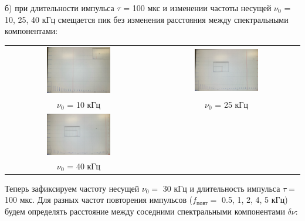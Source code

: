 \documentclass[a4paper,12pt]{article} %
\begin{document}
\hfill \break \hfill \break б) при длительности импульса $\tau$ = 100 мкс и изменении частоты несущей $\nu_{0}$ = 10, 25, 40 кГц смещается пик без изменения расстояния между спектральными компонентами:

\hfill \break \begin{center}
\begin{tabular}{cc}
\includegraphics[width=0.45\textwidth]{11.jpg}&\includegraphics[width=0.45\textwidth]{12.jpg}\\
$\nu_{0}$ = 10 кГц&$\nu_{0}$ = 25 кГц\\
\includegraphics[width=0.45\textwidth]{13.jpg}\\
$\nu_{0}$ = 40 кГц\\
\end{tabular}
\end{center}

\hfill \break Теперь зафиксируем частоту несущей $\nu_{0}=$ 30 кГц и длительность импульса $\tau = $ 100 мкс. Для разных частот повторения импульсов ($f_\text{повт}=$ 0.5, 1, 2, 4, 5 кГц) будем определять расстояние между соседними спектральными компонентами $\delta\nu$:
\end{document}
